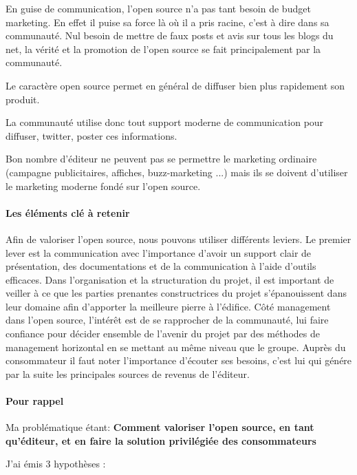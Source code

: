 			En guise de communication, l'open source n'a pas tant besoin de budget marketing. En effet il puise sa force là où il a pris racine, c'est à dire dans sa communauté. Nul besoin de mettre de faux posts et avis sur tous les blogs du net, la vérité et la promotion de l'open source se fait principalement par la communauté.

			Le caractère open source permet en général de diffuser bien plus rapidement son produit.

			La communauté utilise donc tout support moderne de communication pour diffuser, twitter, poster ces informations.

			Bon nombre d'éditeur ne peuvent pas se permettre le marketing ordinaire (campagne publicitaires, affiches, buzz-marketing ...) mais ils se doivent d'utiliser le marketing moderne fondé sur l'open source.

	\paragraph{Les éléments clé à retenir\\}

		Afin de valoriser l'open source, nous pouvons utiliser différents leviers. 
		Le premier lever est la communication avec l'importance d'avoir un support clair de présentation, des documentations et de la communication à l'aide d'outils efficaces.
		Dans l'organisation et la structuration du projet, il est important de veiller à ce que les parties prenantes constructrices du projet s'épanouissent dans leur domaine afin d'apporter la meilleure pierre à l'édifice. Côté management dans l'open source, l'intérêt est de se rapprocher de la communauté, lui faire confiance pour décider ensemble de l'avenir du projet par des méthodes de management horizontal en se mettant au même niveau que le groupe. Auprès du consommateur il faut noter l'importance d'écouter ses besoins, c'est lui qui génére par la suite les principales sources de revenus de l'éditeur.

	\paragraph{Pour rappel\\}

		Ma problématique étant: 
		\textbf{Comment valoriser l'open source, en tant qu'éditeur, et en faire la solution privilégiée des consommateurs}

		J'ai émis 3 hypothèses : 

